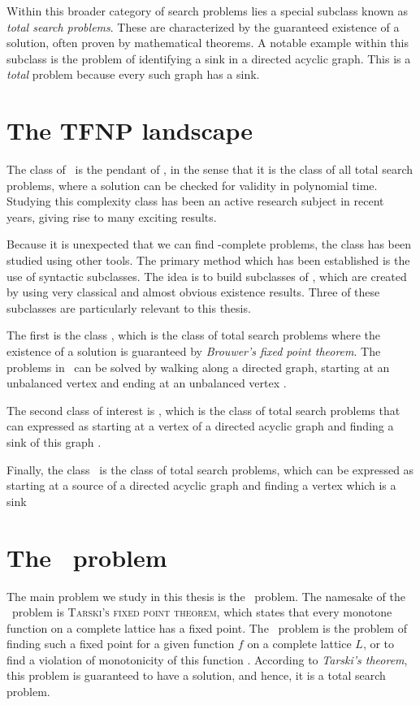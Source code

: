Within this broader category of search problems lies a special subclass known as \emph{total search problems}. These are characterized by the guaranteed existence of a solution, often proven by mathematical theorems. A notable example within this subclass is the problem of identifying a sink in a directed acyclic graph. This is a \textit{total} problem because every such graph has a sink.

\section{The TFNP landscape}

The class of \TFNP\ is the pendant of \NP, in the sense that it is the class of all total search problems, where a solution can be checked for validity in polynomial time. Studying this complexity class has been an active research subject in recent years, giving rise to many exciting results.

Because it is unexpected that we can find \TFNP-complete problems, the class has been studied using other tools. The primary method which has been established is the use of syntactic subclasses. The idea is to build subclasses of \TFNP, which are created by using very classical and almost obvious existence results. Three of these subclasses are particularly relevant to this thesis.

The first is the class \PPAD, which is the class of total search problems where the existence of a solution is guaranteed by \textit{Brouwer's fixed point theorem}. The problems in \PPAD\ can be solved by walking along a directed graph, starting at an unbalanced vertex and ending at an unbalanced vertex .

The second class of interest is \PLS, which is the class of total search problems that can expressed as starting at a vertex of a directed acyclic graph and finding a sink of this graph .

Finally, the class \EOPL\ is the class of total search problems, which can be expressed as starting at a source of a directed acyclic graph and finding a vertex which is a sink 

\section{The \Tarski\ problem}

The main problem we study in this thesis is the \Tarski\ problem. The namesake of the \Tarski\ problem is \textsc{Tarski's fixed point theorem}, which states that every monotone function on a complete lattice has a fixed point. The \Tarski\ problem is the problem of finding such a fixed point for a given function $f$ on a complete lattice $L$, or to find a violation of monotonicity of this function . According to \textit{Tarski's theorem}, this problem is guaranteed to have a solution, and hence, it is a total search problem.

